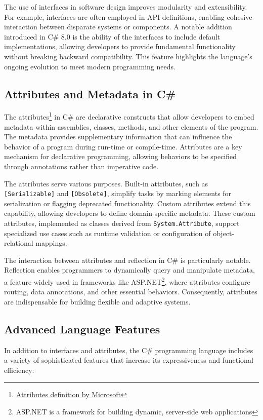 The use of interfaces in software design improves modularity and extensibility. For example, interfaces are often employed in API definitions, enabling cohesive interaction between disparate systems or components. A notable addition introduced in C\# 8.0 is the ability of the interfaces to include default implementations, allowing developers to provide fundamental functionality without breaking backward compatibility. This feature highlights the language's ongoing evolution to meet modern programming needs.

\subsection{Attributes and Metadata in C\#}

The attributes\footnote{\href{https://learn.microsoft.com/en-us/dotnet/csharp/advanced-topics/reflection-and-attributes/}{Attributes definition by Microsoft}} in C\# are declarative constructs that allow developers to embed metadata within assemblies, classes, methods, and other elements of the program. The metadata provides supplementary information that can influence the behavior of a program during run-time or compile-time. Attributes are a key mechanism for declarative programming, allowing behaviors to be specified through annotations rather than imperative code.

The attributes serve various purposes. Built-in attributes, such as \texttt{[Serializable]} and \texttt{[Obsolete]}, simplify tasks by marking elements for serialization or flagging deprecated functionality. Custom attributes extend this capability, allowing developers to define domain-specific metadata. These custom attributes, implemented as classes derived from \texttt{System.Attribute}, support specialized use cases such as runtime validation or configuration of object-relational mappings.

The interaction between attributes and reflection in C\# is particularly notable. Reflection enables programmers to dynamically query and manipulate metadata, a feature widely used in frameworks like ASP.NET\footnote{ASP.NET is a framework for building dynamic, server-side web applications}, where attributes configure routing, data annotations, and other essential behaviors. Consequently, attributes are indispensable for building flexible and adaptive systems.

\subsection{Advanced Language Features}
In addition to interfaces and attributes, the C\# programming language includes a variety of sophisticated features that increase its expressiveness and functional efficiency:

